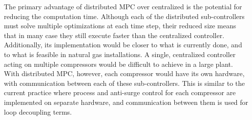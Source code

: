 The primary advantage of distributed MPC over centralized is the potential for reducing the computation time.
Although each of the distributed sub-controllers must solve multiple optimizations at each time step, their reduced size means that in many case they still execute faster than the centralized controller.
Additionally, its implementation would be closer to what is currently done, and to what is feasible in natural gas installations.
A single, centralized controller acting on multiple compressors would be difficult to achieve in a large plant.
With distributed MPC, however, each compressor would have its own hardware, with communication between each of these sub-controllers.
This is similar to the current practice where process and anti-surge control for each compressor are implemented on separate hardware, and communication between them is used for loop decoupling terms.

